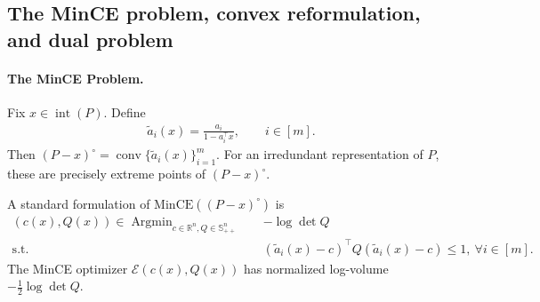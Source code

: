 \documentclass[smallextended]{svjour3}
\DeclareMathOperator*{\Argmin}{Argmin}
\DeclareMathOperator{\conv}{conv}
\newcommand{\R}{\mathbb{R}}
\newcommand{\E}{\mathcal{E}}
\begin{document}
\subsection{The MinCE problem, convex reformulation, and dual problem}
\paragraph{The MinCE Problem.} Fix $x \in \operatorname{int}(P)$. Define
\begin{align}\label{eq: polar_extreme_points}
    \tilde{a}_i(x) = \frac{a_i}{1-a_i^\top x}, \qquad i\in[m].
\end{align}
Then $(P-x)^\circ=\conv\{\tilde a_i(x)\}_{i=1}^m$. For an irredundant
representation of $P$, these are precisely extreme points of $(P-x)^\circ$.

A standard formulation of $\mathrm{MinCE}((P-x)^\circ)$ is
\begin{subequations}\label{eq: MinCE}
\begin{align}
    (c(x), Q(x)) \in \Argmin_{c\in \R^n, Q\in \mathbb{S}^n_{++}}\quad & -\log \det Q \\
    \mathrm{s.t.}\quad & (\tilde{a}_i(x) - c)^\top Q(\tilde{a}_i(x) - c) \leq 1, ~ \forall i\in[m].
\end{align}
\end{subequations}
The MinCE optimizer $\E(c(x),Q(x))$ has normalized log-volume
$-\frac12\log\det Q$.
\end{document}
